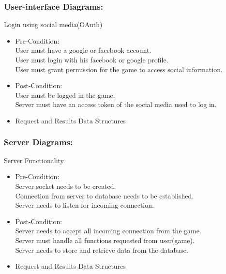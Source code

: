 \documentclass[letterpaper]{article}
\begin{document}
				\vspace{0.2in}
				\subsubsection*{User-interface Diagrams:}
				\vspace{0.2in}
				
				\vspace{0.1in}
					\hspace{5mm}Login using social media(OAuth)
					\begin{itemize}
						\item Pre-Condition: \\
							User must have a google or facebook account. \\
							User must login with his facebook or google profile. \\
							User must grant permission for the game to access social information.
						\item Post-Condition: \\
							User must be logged in the game. \\
							Server must have an access token of the social media used to log in.			
						\item Request and Results Data Structures \\
						
					\end{itemize}
				
				\vspace{0.2in}
				\subsubsection*{Server Diagrams:}
				\vspace{0.2in}
				
				\vspace{0.1in}
					\hspace{5mm}Server Functionality
					\begin{itemize}
						\item Pre-Condition: \\
							Server socket needs to be created. \\
							Connection from server to database needs to be established. \\
							Server needs to listen for incoming connection.
						\item Post-Condition: \\
							Server needs to accept all incoming connection from the game. \\
							Server must handle all functions requested from user(game).\\
							Server needs to store and retrieve data from the database.			
						\item Request and Results Data Structures \\
						
					\end{itemize}
					
\end{document}
